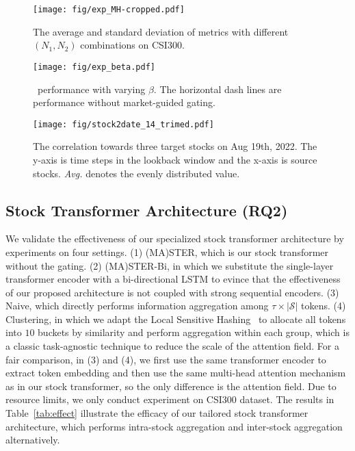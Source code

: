 \begin{figure*}[]
    \texttt{[image: fig/exp\_MH-cropped.pdf]}
\caption{The average and standard deviation of metrics with different $(N_1,N_2)$ combinations on CSI300.}
\label{fig:mh}
\end{figure*}

\begin{figure*}[]
    \texttt{[image: fig/exp\_beta.pdf]}
\caption{\frameworkname~performance with varying $\beta$. The horizontal dash lines are performance without market-guided gating.}
\label{fig:beta}
\end{figure*}

\begin{figure}[t]
    \texttt{[image: fig/stock2date\_14\_trimed.pdf]}
\caption{The correlation towards three target stocks on Aug 19th, 2022. The y-axis is time steps in the lookback window and the x-axis is source stocks. \emph{Avg.} denotes the evenly distributed value.}
\label{fig:stock2date}
\end{figure}
\subsection{Stock Transformer Architecture (RQ2)}
We validate the effectiveness of our specialized stock transformer architecture by experiments on four settings. (1) (MA)STER, which is our stock transformer without the gating. (2) (MA)STER-Bi, in which we substitute the single-layer transformer encoder with a bi-directional LSTM to evince that the effectiveness of our proposed architecture is not coupled with strong sequential encoders.
(3) Naive, which directly performs information aggregation among $\tau \times |\mathcal{S}|$ tokens. 
(4) Clustering, in which we adapt the Local Sensitive Hashing~\cite{kitaev2020reformer} to allocate all tokens into $10$ buckets by similarity and perform aggregation within each group, which is a classic task-agnostic technique to reduce the scale of the attention field. 
For a fair comparison, in (3) and (4), we first use the same transformer encoder to extract token embedding and then use the same multi-head attention mechanism as in our stock transformer, so the only difference is the attention field.
Due to resource limits, we only conduct experiment on CSI300 dataset. The results in Table~\ref{tab:effect} illustrate the efficacy of our tailored stock transformer architecture, which performs intra-stock aggregation and inter-stock aggregation alternatively.

